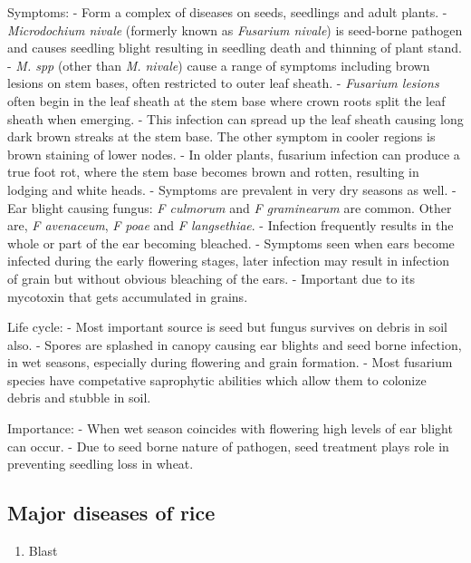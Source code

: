 \documentclass[]{book}
\providecommand{\tightlist}{%
  \setlength{\itemsep}{0pt}\setlength{\parskip}{0pt}}
\begin{document}
Symptoms:
- Form a complex of diseases on seeds, seedlings and adult plants.
- \emph{Microdochium nivale} (formerly known as \emph{Fusarium nivale}) is seed-borne pathogen and causes seedling blight resulting in seedling death and thinning of plant stand.
- \emph{M. spp} (other than \emph{M. nivale}) cause a range of symptoms including brown lesions on stem bases, often restricted to outer leaf sheath.
- \emph{Fusarium lesions} often begin in the leaf sheath at the stem base where crown roots split the leaf sheath when emerging.
- This infection can spread up the leaf sheath causing long dark brown streaks at the stem base. The other symptom in cooler regions is brown staining of lower nodes.
- In older plants, fusarium infection can produce a true foot rot, where the stem base becomes brown and rotten, resulting in lodging and white heads.
- Symptoms are prevalent in very dry seasons as well.
- Ear blight causing fungus: \emph{F culmorum} and \emph{F graminearum} are common. Other are, \emph{F avenaceum}, \emph{F poae} and \emph{F langsethiae}.
- Infection frequently results in the whole or part of the ear becoming bleached.
- Symptoms seen when ears become infected during the early flowering stages, later infection may result in infection of grain but without obvious bleaching of the ears.
- Important due to its mycotoxin that gets accumulated in grains.

Life cycle:
- Most important source is seed but fungus survives on debris in soil also.
- Spores are splashed in canopy causing ear blights and seed borne infection, in wet seasons, especially during flowering and grain formation.
- Most fusarium species have competative saprophytic abilities which allow them to colonize debris and stubble in soil.

Importance:
- When wet season coincides with flowering high levels of ear blight can occur.
- Due to seed borne nature of pathogen, seed treatment plays role in preventing seedling loss in wheat.

\hypertarget{major-diseases-of-rice}{%
\subsection{Major diseases of rice}\label{major-diseases-of-rice}}

\begin{enumerate}
\def\labelenumi{\arabic{enumi}.}
\tightlist
\item
  Blast
\end{enumerate}
\end{document}
